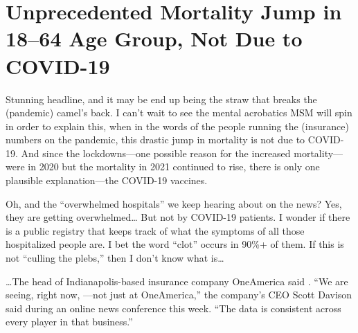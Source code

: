 \chapter{Unprecedented Mortality Jump in 18--64 Age Group, Not Due to COVID-19}

\begin{refsection}

Stunning headline, and it may be end up being the straw that breaks the (pandemic) camel's back. I can't wait to see the mental acrobatics MSM will spin in order to explain this, when in the words of the people running the (insurance) numbers on the pandemic, this drastic jump in mortality is not due to COVID-19. And since the lockdowns---one possible reason for the increased mortality---were in 2020 but the mortality in 2021 continued to rise, there is only one plausible explanation---the COVID-19 vaccines.

Oh, and the \enquote{overwhelmed hospitals} we keep hearing about on the news? Yes, they are getting overwhelmed\dots{} But not by COVID-19 patients. I wonder if there is a public registry that keeps track of what the symptoms of all those hospitalized people are. I bet the word \enquote{clot} occurs in 90\%+ of them. If this is not \enquote{culling the plebs,} then I don't know what is\dots{}

\begin{tcolorbox}[quote]

\dots{}The head of Indianapolis-based insurance company OneAmerica said . \enquote{We are seeing, right now, ---not just at OneAmerica,} the company's CEO Scott Davison said during an online news conference this week. \enquote{The data is consistent across every player in that business.}\textsuperscript{\cite{url90n2ap92m}}

\end{tcolorbox}

\begin{tcolorbox}[quote]


\end{tcolorbox}
\end{refsection}
